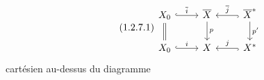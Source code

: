\begin{equation}\tag{1.2.7.1}
\begin{tikzcd}
X_0 \arrow[r, hook, "\overline{i}"] \arrow[d, equal] & \overline{X} \arrow[d, "p"] & \overline{X}^* \arrow[l, hook, "\overline{j}"'] \arrow[d, "p'"] \\
X_0 \arrow[r, hook, "i"] & X & X^* \arrow[l, hook, "j"']
\end{tikzcd}
\end{equation}
cartésien au-dessus du diagramme

